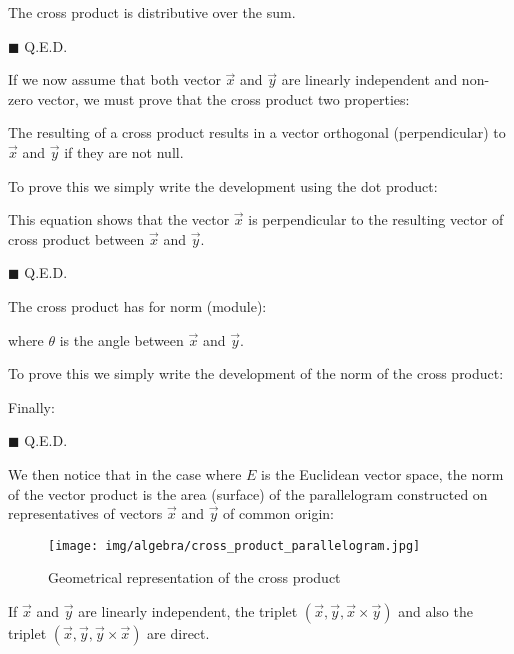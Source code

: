 	\begin{theorem}
	The cross product is distributive over the sum.
	\end{theorem}
	\begin{dem}
	
	\begin{flushright}
		$\blacksquare$  Q.E.D.
	\end{flushright}
	\end{dem}
	
	If we now assume that both vector $\vec{x}$ and $\vec{y}$ are linearly independent and non-zero vector, we must prove that the cross product two properties:
	\begin{theorem}
	The resulting of a cross product results in a vector orthogonal (perpendicular) to $\vec{x}$ and $\vec{y}$ if they are not null.
	\end{theorem}
	\begin{dem}
	To prove this we simply write the development using the dot product:
	
	This equation shows that the vector $\vec{x}$ is perpendicular to the resulting vector of cross product between $\vec{x}$ and $\vec{y}$.
	\begin{flushright}
		$\blacksquare$  Q.E.D.
	\end{flushright}
	\end{dem}
	\begin{theorem}
	The cross product has for norm (module):
	
	where $\theta$ is the angle between $\vec{x}$ and $\vec{y}$.
	\end{theorem}
	\begin{dem}
		To prove this we simply write the development of the norm of the cross product:
		
		Finally:
		
	\begin{flushright}
		$\blacksquare$  Q.E.D.
	\end{flushright}
	\end{dem}
	\label{cross product as surface parallelogram}We then notice that in the case where $E$ is the Euclidean vector space, the norm of the vector product is the area (surface) of the parallelogram constructed on representatives of vectors $\vec{x}$ and $\vec{y}$ of common origin:
	\begin{figure}[H]
		\centering
		\texttt{[image: img/algebra/cross\_product\_parallelogram.jpg]}
		\caption{Geometrical representation of the cross product}
	\end{figure}
	If $\vec{x}$ and $\vec{y}$ are linearly independent, the triplet $(\vec{x},\vec{y},\vec{x}\times \vec{y})$ and also the triplet $(\vec{x},\vec{y},\vec{y}\times \vec{x})$ are direct.
	
